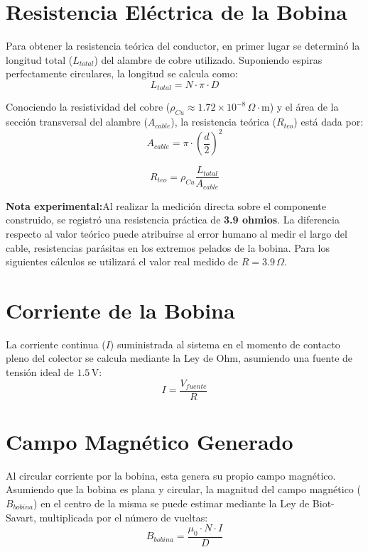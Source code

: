 \documentclass[conference, a4paper]{IEEEtran}
\begin{document}
\section{Resistencia Eléctrica de la Bobina}
Para obtener la resistencia teórica del conductor, en primer lugar se determinó la longitud total ($L_{total}$) del alambre de cobre utilizado. Suponiendo espiras perfectamente circulares, la longitud se calcula como:
\begin{equation}
    L_{total} = N \cdot \pi \cdot D
\end{equation}


Conociendo la resistividad del cobre ($\rho_{Cu} \approx 1.72 \times 10^{-8} \, \Omega\cdot\text{m}$) y el área de la sección transversal del alambre ($A_{cable}$), la resistencia teórica ($R_{teo}$) está dada por:
\begin{equation}
    A_{cable} = \pi \cdot \left(\frac{d}{2}\right)^2 
\end{equation}


\begin{equation}
    R_{teo} = \rho_{Cu} \frac{L_{total}}{A_{cable}}
\end{equation}


\textbf{Nota experimental:}Al realizar la medición directa sobre el componente construido, se registró una resistencia práctica de \textbf{3.9 ohmios}. La diferencia respecto al valor teórico puede atribuirse al error humano al medir el largo del cable, resistencias parásitas en los extremos pelados de la bobina. Para los siguientes cálculos se utilizará el valor real medido de $R = 3.9 \, \Omega$.

\section{Corriente de la Bobina}
La corriente continua ($I$) suministrada al sistema en el momento de contacto pleno del colector se calcula mediante la Ley de Ohm, asumiendo una fuente de tensión ideal de $1.5 \, \text{V}$:
\begin{equation}
    I = \frac{V_{fuente}}{R}
\end{equation}


\section{Campo Magnético Generado}
Al circular corriente por la bobina, esta genera su propio campo magnético. Asumiendo que la bobina es plana y circular, la magnitud del campo magnético ($B_{bobina}$) en el centro de la misma se puede estimar mediante la Ley de Biot-Savart, multiplicada por el número de vueltas:
\begin{equation}
    B_{bobina} = \frac{\mu_0 \cdot N \cdot I}{D}
\end{equation}
\end{document}
